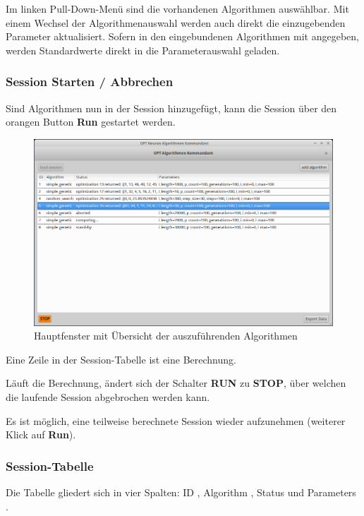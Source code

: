 \documentclass[
  a4paper,               %
  twoside,               %
  DIV=12,                %
  BCOR=8mm,              %
  headinclude=true,      %
  footinclude=false,     %
  numbers=noenddot,      %
  headheight=40pt,       %
  11pt]{scrartcl}        %
\begin{document}
Im linken Pull-Down-Menü sind die vorhandenen Algorithmen auswählbar.
Mit einem Wechsel der Algorithmenauswahl werden auch direkt die einzugebenden Parameter aktualisiert. Sofern in den eingebundenen Algorithmen mit angegeben, werden Standardwerte direkt in die Parameterauswahl geladen.

\newpage
\subsubsection{Session Starten / Abbrechen}
Sind Algorithmen nun in der Session hinzugefügt, kann die Session über den orangen Button \textbf{Run} gestartet werden.

\begin{figure}[h]
\includegraphics[scale=.45]{mainframe.png}
\caption{Hauptfenster mit Übersicht der auszuführenden Algorithmen}
\end{figure}

Eine Zeile in der Session-Tabelle ist eine Berechnung.

Läuft die Berechnung, ändert sich der Schalter \textbf{RUN} zu \textbf{STOP}, über welchen die laufende Session abgebrochen werden kann.

Es ist möglich, eine teilweise berechnete Session wieder aufzunehmen (weiterer Klick auf \textbf{Run}).

\subsubsection{Session-Tabelle}
Die Tabelle gliedert sich in vier Spalten: \glqq ID \grqq, \glqq Algorithm \grqq, \glqq Status \grqq  und \glqq Parameters \grqq.
\end{document}

